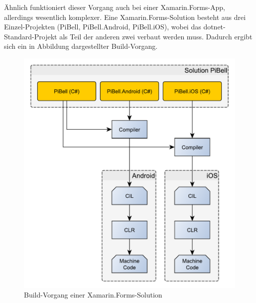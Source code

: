 Ähnlich funktioniert dieser Vorgang auch bei einer Xamarin.Forms-App, allerdings wesentlich komplexer.
Eine Xamarin.Forms-Solution besteht aus drei Einzel-Projekten (PiBell, PiBell.Android, PiBell.iOS), wobei das \acs{dotnet}-Standard-Projekt als Teil der anderen zwei verbaut werden muss.
Dadurch ergibt sich ein in Abbildung  dargestellter Build-Vorgang.
\begin{figure}
    \centering\includegraphics[width=0.9\linewidth]{images/auswahl_rahmenwerk/build-vorgang.pdf}
    \caption{Build-Vorgang einer Xamarin.Forms-Solution}
    \label{fig:build-forms}
\end{figure}

